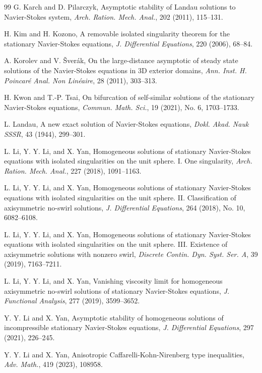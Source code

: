 \documentclass[12pt]{article}
\begin{document}
\begin{thebibliography}{99}
 G. Karch and D. Pilarczyk, Asymptotic stability of Landau solutions to Navier-Stokes system, \emph{Arch. Ration. Mech. Anal.}, 202 (2011), 115--131.

 H. Kim and H. Kozono, A removable isolated singularity theorem for the stationary Navier-Stokes equations, \emph{J. Differential Equations}, 220 (2006), 68--84.

 A. Korolev and V. \v{S}ver\'{a}k, On the large-distance asymptotic of steady state solutions of the Navier-Stokes equations in 3D exterior domains, \emph{Ann. Inst. H. Poincar\'{e} Anal. Non Lin\'{e}aire}, 28 (2011), 303--313.

 H. Kwon and T.-P. Tsai, On bifurcation of self-similar solutions of the stationary Navier-Stokes equations, \emph{Commun. Math. Sci.}, 19 (2021), No. 6, 1703--1733.

 L. Landau, A new exact solution of Navier-Stokes equations, \emph{Dokl. Akad. Nauk SSSR}, 43 (1944), 299--301.

 L. Li, Y. Y. Li, and X. Yan, Homogeneous solutions of stationary Navier-Stokes equations with isolated singularities on the unit sphere. I. One singularity, \emph{Arch. Ration. Mech. Anal.}, 227 (2018), 1091--1163.

 L. Li, Y. Y. Li, and X. Yan, Homogeneous solutions of stationary Navier-Stokes equations with isolated singularities on the unit sphere. II. Classification of axisymmetric no-swirl solutions, \emph{J. Differential Equations}, 264 (2018), No. 10, 6082--6108.

 L. Li, Y. Y. Li, and X. Yan, Homogeneous solutions of stationary Navier-Stokes equations with isolated singularities on the unit sphere. III. Existence of axisymmetric solutions with nonzero swirl, \emph{Discrete Contin. Dyn. Syst. Ser. A}, 39 (2019), 7163--7211.

 L. Li, Y. Y. Li, and X. Yan, Vanishing viscosity limit for homogeneous axisymmetric no-swirl solutions of stationary Navier-Stokes equations, \emph{J. Functional Analysis}, 277 (2019), 3599--3652.

 Y. Y. Li and X. Yan, Asymptotic stability of homogeneous solutions of incompressible stationary Navier-Stokes equations, \emph{J. Differential Equations}, 297 (2021), 226--245.

 Y. Y. Li and X. Yan, Anisotropic Caffarelli-Kohn-Nirenberg type inequalities, \emph{Adv. Math.}, 419 (2023), 108958.


\end{thebibliography}
\end{document}
